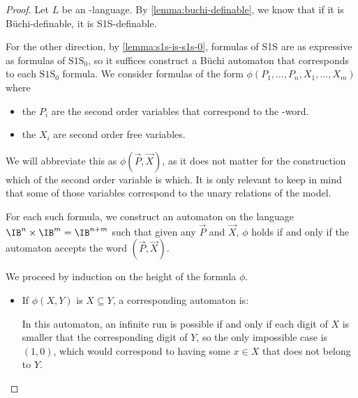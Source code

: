 \begin{proof}
    Let $L$ be an \w-language. By \autoref{lemma:buchi-definable},
    we know that if it is Büchi-definable, it is S1S-definable.

    For the other direction,
    by \autoref{lemma:s1s-is-s1s-0}, formulas of S1S
    are as expressive as formulas of $\text{S1S}_0$,
    so it suffices construct a Büchi automaton
    that corresponds to each $\text{S1S}_0$ formula.
    We consider formulas of the form
    $\phi(P_1, \dots, P_n, X_1, \dots, X_m)$
    where \begin{itemize}
        \item the $P_i$ are the second order variables that
            correspond to the \w-word.
        \item the $X_i$ are second order free variables.
    \end{itemize}
    We will abbreviate this as $\phi(\vec P, \vec X)$,
    as it does not matter for the construction
    which of the second order variable is which.
    It is only relevant to keep in mind that some
    of those variables correspond to the unary relations
    of the model.

    For each such formula, we construct an
    automaton on the language $\IB^n \times \IB^m = \IB^{n+m}$
    such that given any $\vec P$ and $\vec X$, $\phi$ holds
    if and only if the automaton accepts the word $(\vec P, \vec X)$.

    We proceed by induction on the height of the formula $\phi$.
    \begin{itemize}
        \item If $\phi(X, Y)$ is $X \subseteq Y$,
            a corresponding automaton is:
            \begin{center}
            \end{center}
            In this automaton, an infinite run is possible
            if and only if each digit of $X$ is smaller that the
            corresponding digit of $Y$, so the only impossible case is $(1, 0)$,
            which would correspond to having some $x \in X$ that does not belong to $Y$.


\end{itemize}
\end{proof}

